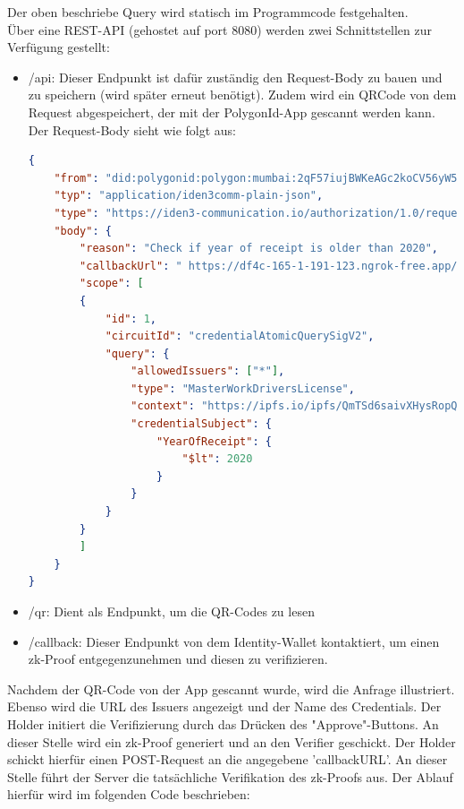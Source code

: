 Der oben beschriebe Query wird statisch im Programmcode festgehalten. \\
Über eine REST-API (gehostet auf port 8080) werden zwei Schnittstellen zur Verfügung gestellt:
\begin{itemize}
	\item /api: Dieser Endpunkt ist dafür zuständig den Request-Body zu bauen und zu speichern (wird später erneut benötigt). Zudem wird ein QRCode von dem Request abgespeichert, der mit der PolygonId-App gescannt werden kann. Der Request-Body sieht wie folgt aus:
	
\begin{lstlisting}[language=json,firstnumber=1]
{
	"from": "did:polygonid:polygon:mumbai:2qF57iujBWKeAGc2koCV56yW5S1SfPtFsCgDHzGRdW",
	"typ": "application/iden3comm-plain-json",
	"type": "https://iden3-communication.io/authorization/1.0/request",
	"body": {
		"reason": "Check if year of receipt is older than 2020",
		"callbackUrl": " https://df4c-165-1-191-123.ngrok-free.app/api/callback?sessionId=1",
		"scope": [
		{
			"id": 1,
			"circuitId": "credentialAtomicQuerySigV2",
			"query": {
				"allowedIssuers": ["*"],
				"type": "MasterWorkDriversLicense",
				"context": "https://ipfs.io/ipfs/QmTSd6saivXHysRopQdM1yswp2qyFwobL7fwuFpkVTS8gd",
				"credentialSubject": {
					"YearOfReceipt": {
						"$lt": 2020
					}
				}
			}
		}
		]
	}
}
\end{lstlisting}	
	\item /qr: Dient als Endpunkt, um die QR-Codes zu lesen
	\item /callback: Dieser Endpunkt von dem Identity-Wallet kontaktiert, um einen zk-Proof entgegenzunehmen und diesen zu verifizieren.
\end{itemize}
Nachdem der QR-Code von der App gescannt wurde, wird die Anfrage illustriert. Ebenso wird die URL des Issuers angezeigt und der Name des Credentials. Der Holder initiert die Verifizierung durch das Drücken des "Approve"-Buttons. An dieser Stelle wird ein zk-Proof generiert und an den Verifier geschickt. Der Holder schickt hierfür einen POST-Request an die angegebene 'callbackURL'. An dieser Stelle führt der Server die tatsächliche Verifikation des zk-Proofs aus. Der Ablauf hierfür wird im folgenden Code beschrieben: \\ \\
